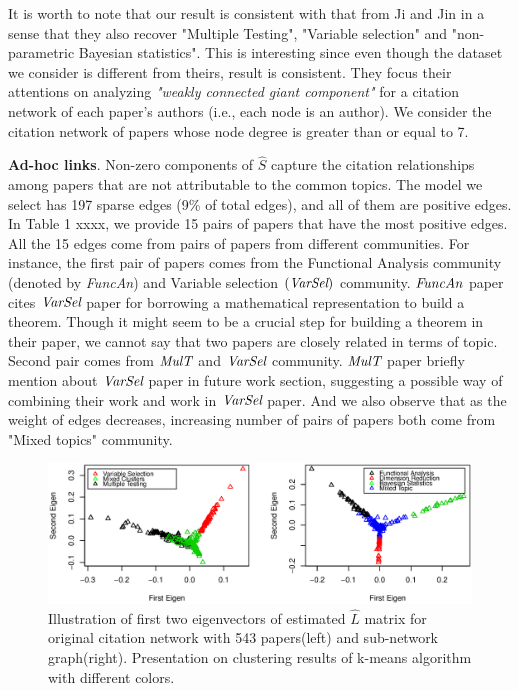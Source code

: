 \documentclass[AMS,STIX1COL]{WileyNJD-v2}
\begin{document}
It is worth to note that our result is consistent with that from Ji and Jin in a sense that they also recover "Multiple Testing", "Variable selection" and "non-parametric Bayesian statistics".
This is interesting since even though the dataset we consider is different from theirs, result is consistent.
They focus their attentions on analyzing \emph{"weakly connected giant component"} for a citation network of each paper's authors ({i.e., each node is an author}).
We consider the citation network of papers whose node degree is greater than or equal to 7.

\textbf{Ad-hoc links}.
Non-zero components of $\widehat{S}$ capture the citation relationships among papers that are not attributable to the common topics.
The model we select has 197 sparse edges (9\% of total edges), and all of them are positive edges.
In Table 1 xxxx, we provide 15 pairs of papers that have the most positive edges.
All the 15 edges come from pairs of papers from different communities.
For instance, the first pair of papers comes from the Functional Analysis community (denoted by \emph{FuncAn}) and Variable selection $(\emph{VarSel})$ community.
$\emph{FuncAn}$ paper cites $\emph{VarSel}$ paper for borrowing a mathematical representation to build a theorem.
Though it might seem to be a crucial step for building a theorem in their paper, we cannot say that two papers are closely related in terms of topic.
Second pair comes from $\emph{MulT}$  and $\emph{VarSel}$ community.
$\emph{MulT}$ paper briefly mention about $\emph{VarSel}$ paper in future work section, suggesting a possible way of combining their work and work in $\emph{VarSel}$ paper.
And we also observe that as the weight of edges decreases, increasing number of pairs of papers both come from "Mixed topics" community.

\begin{figure}[htbp]
\includegraphics[width=1\textwidth]{Fig3.eps}
\caption{Illustration of first two eigenvectors of estimated $\widehat{L}$ matrix for original
citation network with 543 papers(left) and sub-network graph(right). Presentation
on clustering results of k-means algorithm with different colors.}
\label{fig:figure3}
\end{figure}
\end{document}
